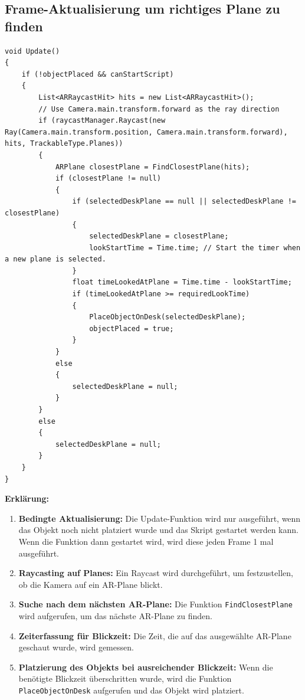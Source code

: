 \subsection*{Frame-Aktualisierung um richtiges Plane zu finden}
\begin{lstlisting}[style=csharp, caption={}, label=code:update]
void Update()
{
    if (!objectPlaced && canStartScript)
    {
        List<ARRaycastHit> hits = new List<ARRaycastHit>();
        // Use Camera.main.transform.forward as the ray direction
        if (raycastManager.Raycast(new Ray(Camera.main.transform.position, Camera.main.transform.forward), hits, TrackableType.Planes))
        {
            ARPlane closestPlane = FindClosestPlane(hits);
            if (closestPlane != null)
            {
                if (selectedDeskPlane == null || selectedDeskPlane != closestPlane)
                {
                    selectedDeskPlane = closestPlane;
                    lookStartTime = Time.time; // Start the timer when a new plane is selected.
                }
                float timeLookedAtPlane = Time.time - lookStartTime;
                if (timeLookedAtPlane >= requiredLookTime)
                {
                    PlaceObjectOnDesk(selectedDeskPlane);
                    objectPlaced = true;
                }
            }
            else
            {
                selectedDeskPlane = null;
            }
        }
        else
        {
            selectedDeskPlane = null;
        }
    }
}
\end{lstlisting}
\textbf{Erklärung:}
\begin{enumerate}
    \item \textbf{Bedingte Aktualisierung:} Die Update-Funktion wird nur ausgeführt, wenn das Objekt noch nicht platziert wurde und das Skript gestartet werden kann. Wenn die Funktion dann gestartet wird, wird diese jeden Frame 1 mal ausgeführt.
    \item \textbf{Raycasting auf Planes:} Ein Raycast wird durchgeführt, um festzustellen, ob die Kamera auf ein AR-Plane blickt.
    \item \textbf{Suche nach dem nächsten AR-Plane:} Die Funktion \texttt{FindClosestPlane} wird aufgerufen, um das nächste AR-Plane zu finden.
    \item \textbf{Zeiterfassung für Blickzeit:} Die Zeit, die auf das ausgewählte AR-Plane geschaut wurde, wird gemessen.
    \item \textbf{Platzierung des Objekts bei ausreichender Blickzeit:} Wenn die benötigte Blickzeit überschritten wurde, wird die Funktion \texttt{PlaceObjectOnDesk} aufgerufen und das Objekt wird platziert.\\
\end{enumerate}

